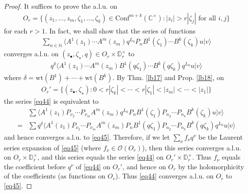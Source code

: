 \documentclass[12pt,b5paper,notitlepage]{article}
\theoremstyle{definition}
\newtheorem{rem}[df]{Remark}
\theoremstyle{plain}
\newcommand{\Conf}{\mathrm{Conf}}
\newcommand{\bk}[1]{\langle {#1}\rangle}
\newcommand{\scr}{\mathscr}
\newcommand{\blt}{\bullet}
\newcommand{\Cbb}{\mathbb C}
\newcommand{\Nbb}{\mathbb N}
\newcommand{\Pbb}{\mathbb P}
\newcommand{\Dbb}{\mathbb D}
\newcommand{\wt}{\mathrm{wt}}
\numberwithin{equation}{section}
\begin{document}
\begin{proof}
It suffices to prove the a.l.u. on
\begin{align*}
O_r=\{(z_1,\dots,z_m,\zeta_1,\dots,\zeta_k)\in\Conf^{m+k}(\Cbb^{\times}):|z_i|>r|\zeta_j|\text{ for all }i,j\}
\end{align*}
for each $r>1$. In fact, we shall show that the series of functions
\begin{align*}
\sum_{n\in\Nbb} \bk{A^1(z_1)\cdots A^m(z_m)q^{L_0}P_nB^1(\zeta_1)\cdots B^k(\zeta_k)u|v}  \tag{a}\label{eq44}
\end{align*}
converges a.l.u. on $(z_\blt,\zeta_\star,q)\in O_r\times \Dbb_r^\times$ to
\begin{align*}
q^\delta\bk{A^1(z_1)\cdots A^m(z_m)B^1(q\zeta_1)\cdots B^k(q\zeta_k)q^{L_0}u|v}  \tag{b}\label{eq45}
\end{align*}
where $\delta=\wt(B^1)+\cdots+\wt(B^k)$. By Thm. \ref{lb17} and Prop. \ref{lb18}, on
\begin{align*}
O_r'=\{(z_\blt,\zeta_\star):0<r|\zeta_k|<\cdots<r|\zeta_1|<|z_m|<\cdots<|z_1|\}
\end{align*}
the series \eqref{eq44} is equivalent to
\begin{align*}
&\sum \bk{A^1(z_1)P_{\nu_2}\cdots P_{\nu_m}A^m(z_m)q^{L_0}P_nB^1(\zeta_1)P_{n_2}\cdots P_{n_k}B^k(\zeta_k)u|v}\\
=&\sum q^\delta\bk{A^1(z_1)P_{\nu_2}\cdots P_{\nu_m}A^m(z_m)P_nB^1(q\zeta_1)P_{n_2}\cdots P_{n_k}B^k(q\zeta_k)q^{L_0}u|v}
\end{align*}
and hence converges a.l.u. to \eqref{eq45}. Therefore, if we let $\sum_\nu f_\nu q^\nu$ be the Laurent series expansion of \eqref{eq45} (where $f_\nu\in\scr O(O_r)$), then this series converges a.l.u. on $O_r\times\Dbb_r^\times$, and this series equals the series \eqref{eq44} on $O_r'\times\Dbb_r^\times$. Thus $f_\nu$ equals the coefficient before $q^\nu$ of \eqref{eq44} on $O_r'$, and hence on $O_r$ by the holomorphicity of the coefficients (as functions on $O_r$). Thus \eqref{eq44} converges a.l.u. on $O_r$ to \eqref{eq45}.
\end{proof}

\end{document}
